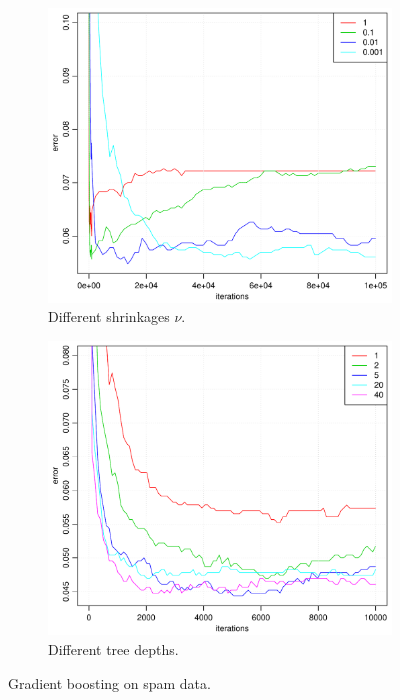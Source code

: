 \begin{figure}[htbp]
  \centering
  \begin{subfigure}[b]{0.48\textwidth}
    \includegraphics[width=\textwidth]{./figures/gradboostSpamShrink2.pdf}
    \caption{Different shrinkages $\nu$.}
    \label{fig:gradboostSpamShrink2}
  \end{subfigure}%
  \quad
  \begin{subfigure}[b]{0.48\textwidth}
    \includegraphics[width=\textwidth]{./figures/gradboostSpamDepth.pdf}
    \caption{Different tree depths.}
    \label{fig:gradboostSpamDepth}
  \end{subfigure}
  \vspace{1\baselineskip}
  \caption{Gradient boosting on spam data.}
  \label{fig:GradBoostSpam}
\end{figure}


